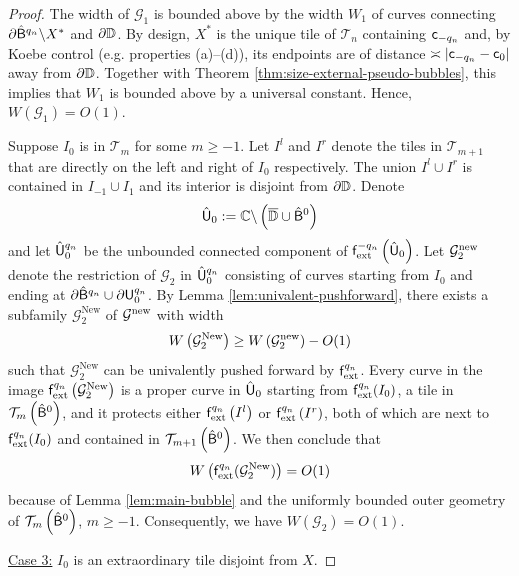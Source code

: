 \documentclass{amsart}
\begin{document}
\begin{proof}
    The width of $\mathcal{G}_1$ is bounded above by the width $W_1$ of curves connecting $\partial{\hat{\ensuremath{\mathsf{B}}}}^{q_n} \backslash X^*$ and $\partial \mathbb{D}$. 
    By design, $X^*$ is the unique tile of $\mathcal{T}_n$ containing $\mathsf{c}_{-q_n}$ and, by Koebe control (e.g. properties (a)--(d)), its endpoints are of distance $\asymp |\mathsf{c}_{-q_n}-\mathsf{c}_0|$ away from $\partial \mathbb{D}$.
    Together with Theorem \ref{thm:size-external-pseudo-bubbles}, this implies that $W_1$ is bounded above by a universal constant.
    Hence, $W(\mathcal{G}_1) = O(1)$.

    Suppose $I_0$ is in $\mathcal{T}_m$ for some $m \geq -1$. 
    Let $I^l$ and $I^r$ denote the tiles in $\mathcal{T}_{m+1}$ that are directly on the left and right of $I_0$ respectively. 
    The union $I^l \cup I^r$ is contained in $I_{-1} \cup I_1$ and its interior is disjoint from $\partial \mathbb{D}$.
    Denote 
    \[
    \hat{\mathsf{U}}_0 := \mathbb{C} \backslash \left(\overline{\mathbb{D}} \cup \hat{\mathsf{B}}^0\right)
    \]
    and let $\hat{\mathsf{U}}^{q_n}_0$ be the unbounded connected component of $\mathsf{f}_{\textnormal{ext}}^{-q_n} \left( \hat{\mathsf{U}}_0 \right)$. 
    Let $\mathcal{G}_2^{\textnormal{new}}$ denote the restriction of $\mathcal{G}_2$ in $\hat{\mathsf{U}}_0^{q_n}$ consisting of curves starting from $I_0$ and ending at $\partial \hat{\mathsf{B}}^{q_n} \cup \partial \mathsf{U}_0^{q_n}$. 
    By Lemma \ref{lem:univalent-pushforward}, there exists a subfamily $\mathcal{G}_2^{\text{New}}$ of $\mathcal{G}^{\textnormal{new}}$ with width
        \[
            W \left(\mathcal{G}_2^{\text{New}} \right) \geq W \left(\mathcal{G}_2^{\textnormal{new}}\right) - O(1)
        \]
    such that $\mathcal{G}_2^{\text{New}}$ can be univalently pushed forward by $\mathsf{f}_{\textnormal{ext}}^{q_n}$. 
    Every curve in the image $\mathsf{f}_{\textnormal{ext}}^{q_n}\left(\mathcal{G}_2^{\text{New}}\right)$ is a proper curve in $\hat{\mathsf{U}}_0$ starting from $\mathsf{f}_{\textnormal{ext}}^{q_n}(I_0)$, a tile in $\mathcal{T}_m \left(\hat{\mathsf{B}}^0 \right)$, 
    and it protects either $\mathsf{f}_{\textnormal{ext}}^{q_n} \left(I^l\right)$ or $\mathsf{f}_{\textnormal{ext}}^{q_n} \left(I^r\right)$, both of which are next to $\mathsf{f}_{\textnormal{ext}}^{q_n}(I_0)$ and contained in $\mathcal{T}_{m+1}\left(\hat{\mathsf{B}}^0\right)$. 
    We then conclude that 
    \[
    W \left( \mathsf{f}_{\textnormal{ext}}^{q_n}(\mathcal{G}_2^{\text{New}})\right) = O(1)
    \]
    because of Lemma \ref{lem:main-bubble} and the uniformly bounded outer geometry of $\mathcal{T}_{m}\left(\hat{\mathsf{B}}^0\right)$, $m \geq -1$. Consequently, we have $W(\mathcal{G}_2) = O(1)$.    
    \vspace{0.05in}
     
    \noindent \underline{Case 3:} $I_0$ is an extraordinary tile disjoint from $X$. 
    \vspace{0.05in}
    

\end{proof}
\end{document}
